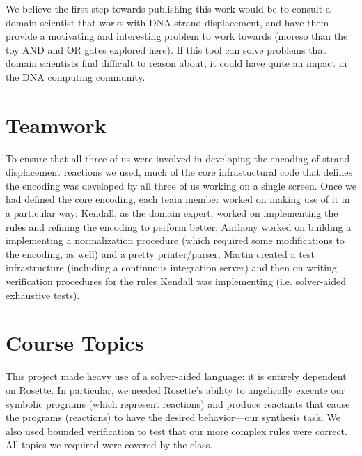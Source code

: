 \documentclass{article}
\begin{document}
We believe the first step towards publishing this work would be to
consult a domain scientist that works with DNA strand displacement,
and have them provide a motivating and interesting problem to work
towards (moreso than the toy AND and OR gates explored here). 
If this tool can solve problems that domain scientists find difficult
to reason about, it could have quite an impact in the DNA computing
community.

\section{Teamwork}

To ensure that all three of us were involved in developing the encoding of
strand displacement reactions we used, much of the core infrastuctural code
that defines the encoding was developed by all three of us working on a single
screen. Once we had defined the core encoding, each team member worked on
making use of it in a particular way: Kendall, as the domain expert, worked
on implementing the rules and refining the encoding to perform better; Anthony
worked on building a implementing a normalization procedure (which required
some modifications to the encoding, as well) and a pretty printer/parser;
Martin created a test infrastructure (including a continuous integration server)
and then on writing verification procedures for the rules Kendall was
implementing (i.e. solver-aided exhaustive tests).

\section{Course Topics}

This project made heavy use of a solver-aided language: it is entirely dependent
on Rosette. In particular, we needed Rosette's ability to angelically execute
our symbolic programs (which represent reactions) and produce reactants that
cause the programs (reactions) to have the desired behavior---our synthesis
task. We also used bounded verification to test that our more complex
rules were correct. All topics we required were covered by the class.
\end{document}
